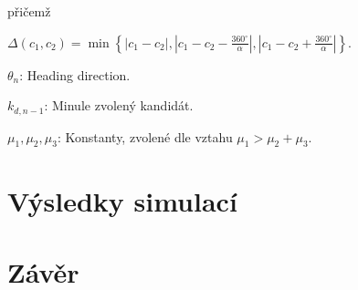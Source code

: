 \documentclass[twoside]{ctuthesis}
\theoremstyle{plain}
\theoremstyle{definition}
\theoremstyle{note}
\begin{document}
přičemž

$\Delta(c_1, c_2) = \min\left\{|c_1 - c_2|, |c_1 - c_2 - \frac{360^{\circ}}{\alpha}|, |c_1 - c_2 + \frac{360^{\circ}}{\alpha}|\right\}$.

$\theta_n$: Heading direction.

$k_{d, n-1}$: Minule zvolený kandidát.

$\mu_1, \mu_2, \mu_3$: Konstanty, zvolené dle vztahu $\mu_1 > \mu_2 + \mu_3$.



\chapter{Výsledky simulací}

\chapter{Závěr}
\appendix

\printindex

%
%
\end{document}
